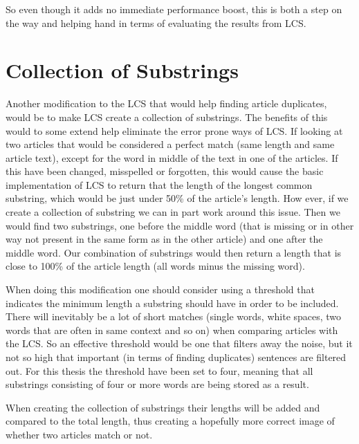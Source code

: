 So even though it adds no immediate performance boost, this is both a step on the way and helping hand in terms of evaluating the results from LCS.

\section{Collection of Substrings}
Another modification to the LCS that would help finding article duplicates, would be to make LCS create a collection of substrings. The benefits of this would to some extend help eliminate the error prone ways of LCS. If looking at two articles that would be considered a perfect match (same length and same article text), except for the word in middle of the text in one of the articles. If this have been changed, misspelled or forgotten, this would cause the basic implementation of LCS to return that the length of the longest common substring, which would be just under 50\% of the article's length. How ever, if we create a collection of substring we can in part work around this issue. Then we would find two substrings, one before the middle word (that is missing or in other way not present in the same form as in the other article) and one after the middle word. Our combination of substrings would then return a length that is close to 100\% of the article length (all words minus the missing word).

When doing this modification one should consider using a threshold that indicates the minimum length a substring should have in order to be included. There will inevitably be a lot of short matches (single words, white spaces, two words that are often in same context and so on) when comparing articles with the LCS. So an effective threshold would be one that filters away the noise, but it not so high that important (in terms of finding duplicates) sentences are filtered out. For this thesis the threshold have been set to four, meaning that all substrings consisting of four or more words are being stored as a result.

When creating the collection of substrings their lengths will be added and compared to the total length, thus creating a hopefully more correct image of whether two articles match or not.

